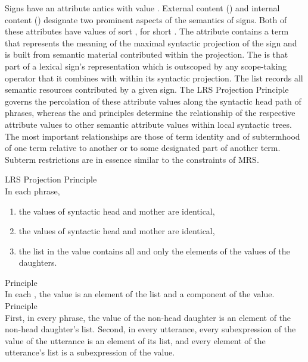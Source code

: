 \documentclass[output=paper]{langsci/langscibook}
\begin{document}
Signs have an attribute antics with value
. External content () and internal content
() designate two prominent aspects of the semantics of
signs. Both of these attributes have
values of sort , for short
. The attribute  contains a term
that represents the meaning of the maximal syntactic projection of the sign
and is built from semantic material contributed within the projection. The
 is that part of a lexical sign's representation which is
outscoped by any scope-taking operator that it combines with within
its syntactic projection. The  list records all semantic
resources contributed by a given sign. The LRS Projection Principle
governs the percolation of these attribute values along the syntactic
head path of phrases, whereas the  and 
principles determine the relationship of the respective attribute
values to other semantic attribute values within local syntactic
trees. The most important relationships are those of term identity and
of subtermhood of one term relative to another or to some designated part
of another term. Subterm restrictions are in essence similar
to the  constraints of MRS.

\begin{exe}
  \ex\label{lrs-essent-principles}
  \begin{xlist}
    \ex\label{lrs-projection} LRS Projection Principle\\
    In each phrase,
    \begin{enumerate}
    \item the  values of syntactic head and mother are identical,
    \item the  values of syntactic head and mother are identical,
    \item the list in the  value contains all and only the elements
    of the  values of the daughters.
    \end{enumerate}
    \ex\label{lrs-incont}  Principle\\
    In each , the  value is an element of the
     list and a component of the  value.
    \ex\label{lrs-excont}  Principle\\
    First, in every phrase, the  value of the non-head daughter
    is an element of the non-head daughter's  list. Second, in
    every utterance, every subexpression of the  value of the
    utterance is an element of its  list, and every element of
    the utterance's  list is a subexpression of the 
    value.
  \end{xlist}
\end{exe}
\end{document}
